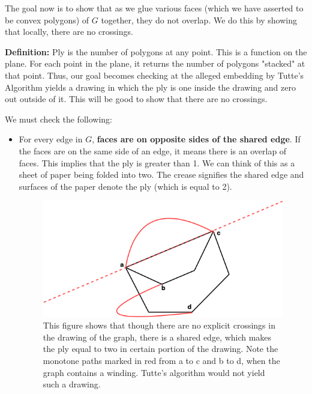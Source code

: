 \documentclass{article}
\begin{document}
    \medskip \noindent The goal now is to show that as we glue various faces (which we have asserted to be convex polygons) of $G$ together, they do not overlap. We do this by showing that locally, there are no crossings. 
    
    \medskip \noindent \textbf{Definition:} Ply is the number of polygons at any point. This is a function on the plane. For each point in the plane, it returns the number of polygons "stacked" at that point. 
    \medskip \noindent Thus, our goal becomes checking at the alleged embedding by Tutte's Algorithm yields a drawing in which the ply is one inside the drawing and zero out outside of it. This will be good to show that there are no crossings.
    
    \medskip \noindent We must check the following:
    \begin{itemize}
        \item For every edge in $G$, \textbf{faces are on opposite sides of the shared edge}. If the faces are on the same side of an edge, it means there is an overlap of faces. This implies that the ply is greater than 1. We can think of this as a sheet of paper being folded into two. The crease signifies the shared edge and surfaces of the paper denote the ply (which is equal to 2).
        
        \begin{figure}[H]
        \centering
        \includegraphics[scale=0.5]{Images/shared_edge_ply.png}
        \caption{This figure shows that though there are no explicit crossings in the drawing of the graph, there is a shared edge, which makes the ply equal to two in certain portion of the drawing. Note the monotone paths marked in red from a to c and b to d, when the graph contains a winding. Tutte's algorithm would not yield such a drawing.}
        \label{fig:my_label}
        \end{figure}
    

\end{itemize}
\end{document}
